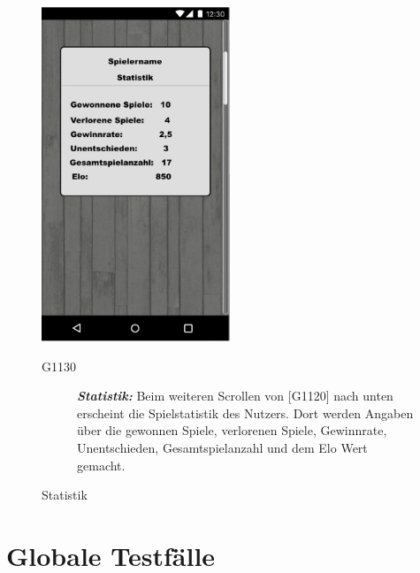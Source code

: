 \documentclass[parskip=full]{scrartcl}
\begin{document}
\begin{figure}[htp]
		\begin{minipage}[t]{6cm}
			\vspace{0pt}
			\includegraphics[height=100mm]{statistik.png}
			\caption{Statistik}
			\label{fig:Statistik}
		\end{minipage}
		\hfill
		\begin{minipage}[t]{6cm}
			\vspace{0pt}
			\begin{description}
				\item[G1130] \textbf{\textit{Statistik: }} Beim weiteren Scrollen von [G1120] nach unten erscheint die Spielstatistik des Nutzers. Dort werden Angaben über die gewonnen Spiele, verlorenen Spiele, Gewinnrate, Unentschieden, Gesamtspielanzahl und dem Elo Wert gemacht.
			\end{description}
		\end{minipage}
	\end{figure}
	\newpage
	\clearpage
	
	\section{Globale Testfälle}
\end{document}
